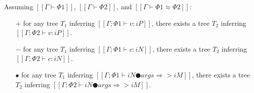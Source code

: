 \begin{lemma}
    \label{lemma:decl-typing-context-equiv}
    Assuming $[[Γ ⊢ Φ1]]$, $[[Γ ⊢ Φ2]]$, and $[[Γ ⊢ Φ1 ≈ Φ2]]$:
    \begin{itemize}
        \item [$+$] 
            for any tree $T_1$ inferring $[[Γ ; Φ1 ⊢ v : iP]]$, 
            there exists a tree $T_2$ inferring $[[Γ ; Φ2 ⊢ v : iP]]$.
        \item [$-$] 
            for any tree $T_1$ inferring $[[Γ ; Φ1 ⊢ c : iN]]$, 
            there exists a tree $T_2$ inferring $[[Γ ; Φ2 ⊢ c : iN]]$.
        \item [$\bullet$] 
            for any tree $T_1$ inferring $[[Γ ; Φ1 ⊢ iN ● args ⇒> iM]]$, 
            there exists a tree $T_2$ inferring $[[Γ ; Φ2 ⊢ iN ● args ⇒> iM]]$.
    \end{itemize}
\end{lemma}
